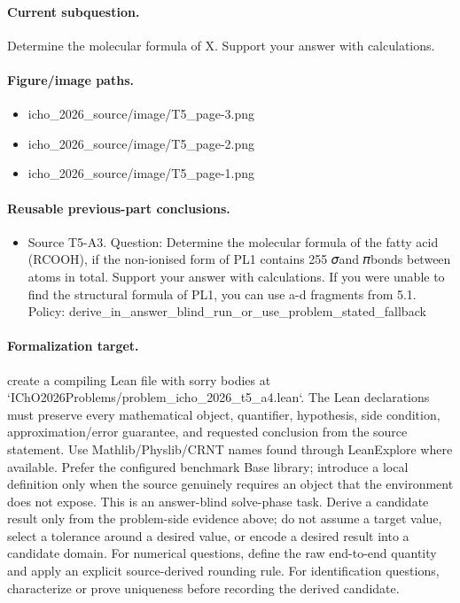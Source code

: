 \paragraph{Current subquestion.}
Determine the molecular formula of X. Support your answer with calculations.

\paragraph{Figure/image paths.}
\begin{itemize}
\item icho\_2026\_source/image/T5\_page-3.png
\item icho\_2026\_source/image/T5\_page-2.png
\item icho\_2026\_source/image/T5\_page-1.png
\end{itemize}

\paragraph{Reusable previous-part conclusions.}
\begin{itemize}
\item Source T5-A3. Question: Determine the molecular formula of the fatty acid (RCOOH), if the non-ionised form of PL1 contains 255 𝜎and 𝜋bonds between atoms in total. Support your answer with calculations. If you were unable to find the structural formula of PL1, you can use a-d fragments from 5.1. Policy: derive\_in\_answer\_blind\_run\_or\_use\_problem\_stated\_fallback
\end{itemize}

\paragraph{Formalization target.}
create a compiling Lean file with sorry bodies at `IChO2026Problems/problem\_icho\_2026\_t5\_a4.lean`.
The Lean declarations must preserve every mathematical object, quantifier, hypothesis, side condition, approximation/error guarantee, and requested conclusion from the source statement.
Use Mathlib/Physlib/CRNT names found through LeanExplore where available. Prefer the configured benchmark Base library; introduce a local definition only when the source genuinely requires an object that the environment does not expose.
This is an answer-blind solve-phase task. Derive a candidate result only from the problem-side evidence above; do not assume a target value, select a tolerance around a desired value, or encode a desired result into a candidate domain.
For numerical questions, define the raw end-to-end quantity and apply an explicit source-derived rounding rule. For identification questions, characterize or prove uniqueness before recording the derived candidate.

